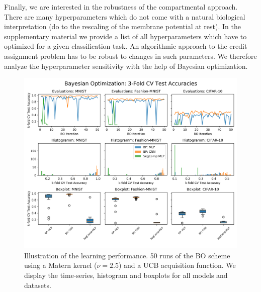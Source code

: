\documentclass[colorinlistoftodos]{article}
\theoremstyle{definition}
\begin{document}
Finally, we are interested in the robustness of the compartmental approach. There are many hyperparameters which do not come with a natural biological interpretation (do to the rescaling of the membrane potential at rest). In the supplementary material we provide a list of all hyperparameters which have to optimized for a given classification task. An algorithmic approach to the credit assignment problem has to be robust to changes in such parameters. We therefore analyze the hyperparameter sensitivity with the help of Bayesian optimization.

\begin{figure}[H]
	\centering
	\includegraphics[width=\textwidth]{../figures/bayes_opt_comparison}
	\caption{Illustration of the learning performance. 50 runs of the BO scheme using a Matern kernel ($\nu=2.5$) and a UCB acquisition function. We display the time-series, histogram and boxplots for all models and datasets.}\label{fig:bo}
\end{figure}
\end{document}
